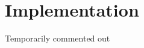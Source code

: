 \documentclass[fleqn,usenatbib]{mnras}
\newcommand{\acro}{TREVR}
\begin{document}
\section{Implementation}\label{sec:implement}
Temporarily commented out
%
%
\end{document}
